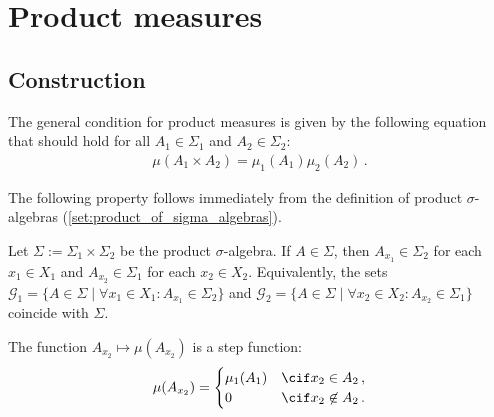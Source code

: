 \section{Product measures}
\subsection{Construction}

    The general condition for product measures is given by the following equation that should hold for all $A_1\in\Sigma_1$ and $A_2\in\Sigma_2$:
    \begin{gather}
        \label{measure:general_condition}
        \mu(A_1\times A_2) = \mu_1(A_1)\mu_2(A_2)\,.
    \end{gather}

    The following property follows immediately from the definition of product $\sigma$-algebras (\cref{set:product_of_sigma_algebras}).
    \begin{property}
        Let $\Sigma := \Sigma_1\times\Sigma_2$ be the product $\sigma$-algebra. If $A\in\Sigma$, then $A_{x_1}\in\Sigma_2$ for each $x_1\in X_1$ and $A_{x_2}\in\Sigma_1$ for each $x_2\in X_2$. Equivalently, the sets $\mathcal{G}_1 = \{A\in\Sigma\mid\forall x_1\in X_1:A_{x_1}\in\Sigma_2\}$ and $\mathcal{G}_2 = \{A\in\Sigma\mid\forall x_2\in X_2: A_{x_2}\in\Sigma_1\}$ coincide with $\Sigma$.
    \end{property}

    \begin{property}
        The function $A_{x_2}\mapsto\mu(A_{x_2})$ is a step function:
        \begin{gather}
            \mu(A_{x_2}) =
            \begin{cases}
                \mu_1(A_1)&\cif x_2\in A_2\,,\\
                0&\cif x_2\not\in A_2\,.
            \end{cases}
        \end{gather}
    \end{property}

